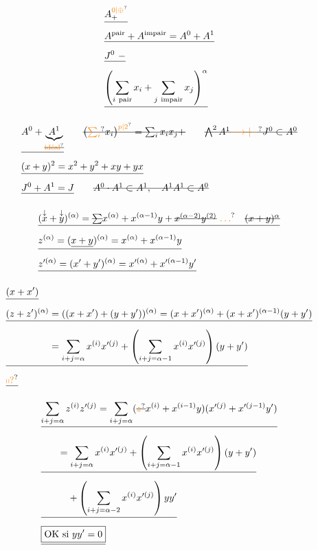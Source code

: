 \[
\begin{aligned}
 &\deleted{A^{\unsure{0|\oplus}}_+}\\
 &\deleted{A^{\mathrm{pair}}+A^{\mathrm{impair}}=A^0+A^1}\\
 &\deleted{J^0\ -}\\
 &\deleted{\left(\sum_{i\ \mathrm{pair}}x_i+\sum_{j\ \mathrm{impair}}x_j\right)^\alpha}
\end{aligned}
\]

\[
\begin{aligned}
 &\deleted{A^0+\underbrace{A^1}_{\deleted{\unsure{\text{idéal}}}}}\qquad
 \deleted{\left(\unsure{\sum_i} x_i\right)^{\unsure{p|2}}=\sum_i x_i x_j+}
 \qquad \deleted{\bigwedge^2 A^1\unsure{\longrightarrow|-}J^0\subset A^0}\\
 &\deleted{(x+y)^2=x^2+y^2+xy+yx}\\
 &\deleted{J^0+A^1=J}\qquad \deleted{A^0\cdot A^1\subset A^1,\quad A^1 A^1\subset A^0}
\end{aligned}
\]

\[
\begin{aligned}
 &\deleted{(\overset{\downarrow}{x}+\overset{\downarrow}{y})^{(\alpha)}
 =\deleted{\sum}x^{(\alpha)}+x^{(\alpha-1)}y+
 \deleted{x^{(\alpha-2)}y^{(2)}}\ \unsure{\ldots}\quad\deleted{(x+y)^\alpha}}\\
 &\deleted{z^{(\alpha)}=(\underline{x+y})^{(\alpha)}=x^{(\alpha)}+x^{(\alpha-1)}y}\\
 &\deleted{z'^{(\alpha)}=(x'+y')^{(\alpha)}=x'^{(\alpha)}+x'^{(\alpha-1)}y'}
\end{aligned}
\]

\[
\begin{aligned}
 &\deleted{(x+x')}\\
 &\deleted{(z+z')^{(\alpha)}=((x+x')+(y+y'))^{(\alpha)}=(x+x')^{(\alpha)}+(x+x')^{(\alpha-1)}(y+y')}\\
 &\deleted{\phantom{(z+z')^{(\alpha)}}=\sum_{i+j=\alpha}x^{(i)}x'^{(j)}
 +\left(\sum_{i+j=\alpha-1}x^{(i)}x'^{(j)}\right)(y+y')}\\
 &\deleted{\unsure{\shortparallel?}}
\end{aligned}
\]

\[
\begin{aligned}
 &\deleted{\sum_{i+j=\alpha}z^{(i)}z'^{(j)}=\sum_{i+j=\alpha}(\deleted{\unsure{z}}x^{(i)}+x^{(i-1)}y)(x'^{(j)}+x'^{(j-1)}y')}\\
 &\deleted{\qquad=\sum_{i+j=\alpha}x^{(i)}x'^{(j)}+\left(\sum_{i+j=\alpha-1}x^{(i)}x'^{(j)}\right)(y+y')}\\
 &\deleted{\qquad\quad+\left(\sum_{i+j=\alpha-2}x^{(i)}x'^{(j)}\right)yy'}\\
 &\deleted{\boxed{\text{OK si }yy'=0}}
\end{aligned}
\]

